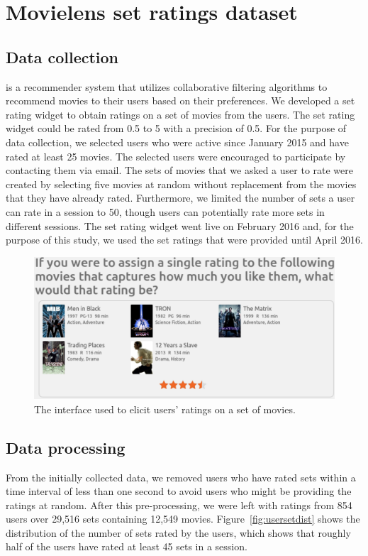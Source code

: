 \section{Movielens set ratings dataset} \label{ch:lfs:dataset}
\subsection{Data collection}
\ML is a recommender system that utilizes
collaborative filtering algorithms to recommend movies to their users based on
their preferences. We developed a set rating widget to obtain ratings on a set
of movies from the \ML users.  
The set rating widget could be
rated from 0.5 to 5 with a precision of 0.5.  
For the purpose of data collection, we selected users who were active since
January 2015 and have rated at least 25 movies. The selected users were
encouraged to participate by contacting them via email. 
The sets of movies that we asked a user to rate were created by selecting five
movies at random without replacement from the movies that they have already
rated. Furthermore, we limited the number of
sets a user can rate in a session to 50, though users can potentially rate
more sets in different sessions.
The set rating widget went live on February 2016 and, for the purpose of this
study, we used the set ratings that were provided until April 2016.



\begin{figure}[ht]
  \centerline{\includegraphics[scale=0.28]{figures/mlset.pdf}}
  \caption{The interface used to elicit users' ratings on a set of movies.}
  \label{fig:mlset}
\end{figure}

\subsection {Data processing}
From the initially collected data, we removed users who have rated sets within a
time interval of less than one second to avoid users who might be providing
the ratings at random. After this pre-processing, we were left with ratings
from 854 users over 29,516  sets containing 12,549 movies.
Figure~\ref{fig:usersetdist} 
shows the distribution of the number of sets rated by the users,
which shows that roughly half of the users have rated at least 45 sets in a session.


